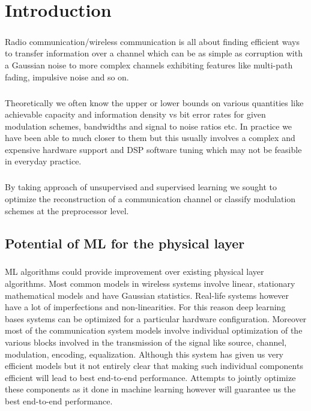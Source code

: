 
\chapter{Introduction}
\paragraph{}Radio communication/wireless communication is all about finding efficient ways to transfer information over a channel which can be as simple as corruption with a Gaussian noise to more complex channels exhibiting features like multi-path fading, impulsive noise and so on. 
\paragraph{}Theoretically we often know the upper or lower bounds on various quantities like achievable capacity and information density vs bit error rates for given modulation schemes, bandwidths and signal to noise ratios etc. In practice we have been able to much closer to them but this usually involves a complex and expensive hardware support and DSP software tuning which may not be feasible in everyday practice.
\paragraph{}By taking approach of unsupervised and supervised learning we sought to optimize the reconstruction of a communication channel or classify modulation schemes at the preprocessor level. 

\section{Potential of ML for the physical layer}
\paragraph{} ML algorithms could provide improvement over existing physical layer algorithms. Most common models in wireless systems involve linear, stationary mathematical models and have Gaussian statistics. Real-life systems however have a lot of imperfections and non-linearities. For this reason deep learning bases systems can be optimized for a particular hardware configuration. Moreover most of the communication system models involve individual optimization of the various blocks involved in the transmission of the signal like source, channel, modulation, encoding, equalization. Although this system has given us very efficient models but it not entirely clear that making such individual components efficient will lead to best end-to-end performance. Attempts to jointly optimize these components as it done in machine learning however will guarantee us the best end-to-end performance. 


